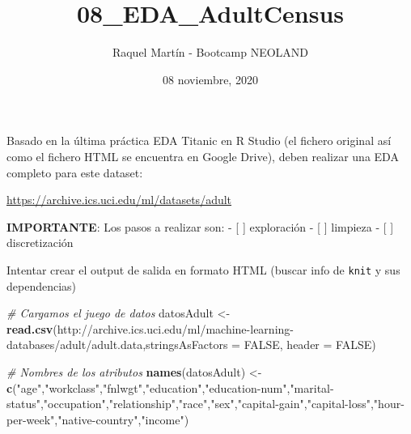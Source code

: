 \documentclass[]{article}
\title{08\_EDA\_AdultCensus}
\author{Raquel Martín - Bootcamp NEOLAND}
\date{08 noviembre, 2020}
\newenvironment{Shaded}{\begin{snugshade}}{\end{snugshade}}
\newcommand{\CommentTok}[1]{\textcolor[rgb]{0.56,0.35,0.01}{\textit{#1}}}
\newcommand{\DataTypeTok}[1]{\textcolor[rgb]{0.13,0.29,0.53}{#1}}
\newcommand{\KeywordTok}[1]{\textcolor[rgb]{0.13,0.29,0.53}{\textbf{#1}}}
\newcommand{\NormalTok}[1]{#1}
\newcommand{\OperatorTok}[1]{\textcolor[rgb]{0.81,0.36,0.00}{\textbf{#1}}}
\newcommand{\OtherTok}[1]{\textcolor[rgb]{0.56,0.35,0.01}{#1}}
\newcommand{\StringTok}[1]{\textcolor[rgb]{0.31,0.60,0.02}{#1}}
\begin{document}
\maketitle

{
\setcounter{tocdepth}{2}
\tableofcontents
}
Basado en la última práctica EDA Titanic en R Studio (el fichero
original así como el fichero HTML se encuentra en Google Drive), deben
realizar una EDA completo para este dataset:

\url{https://archive.ics.uci.edu/ml/datasets/adult}

\textbf{IMPORTANTE}: Los pasos a realizar son: - {[} {]} exploración -
{[} {]} limpieza - {[} {]} discretización

Intentar crear el output de salida en formato HTML (buscar info de
\texttt{knit} y sus dependencias)

\begin{Shaded}
\begin{Highlighting}[]
\CommentTok{\# Cargamos el juego de datos}
\NormalTok{datosAdult \textless{}{-}}\StringTok{ }\KeywordTok{read.csv}\NormalTok{(}\StringTok{\textquotesingle{}http://archive.ics.uci.edu/ml/machine{-}learning{-}databases/adult/adult.data\textquotesingle{}}\NormalTok{,}\DataTypeTok{stringsAsFactors =} \OtherTok{FALSE}\NormalTok{, }\DataTypeTok{header =} \OtherTok{FALSE}\NormalTok{)}

\CommentTok{\# Nombres de los atributos}
\KeywordTok{names}\NormalTok{(datosAdult) \textless{}{-}}\StringTok{ }\KeywordTok{c}\NormalTok{(}\StringTok{"age"}\NormalTok{,}\StringTok{"workclass"}\NormalTok{,}\StringTok{"fnlwgt"}\NormalTok{,}\StringTok{"education"}\NormalTok{,}\StringTok{"education{-}num"}\NormalTok{,}\StringTok{"marital{-}status"}\NormalTok{,}\StringTok{"occupation"}\NormalTok{,}\StringTok{"relationship"}\NormalTok{,}\StringTok{"race"}\NormalTok{,}\StringTok{"sex"}\NormalTok{,}\StringTok{"capital{-}gain"}\NormalTok{,}\StringTok{"capital{-}loss"}\NormalTok{,}\StringTok{"hour{-}per{-}week"}\NormalTok{,}\StringTok{"native{-}country"}\NormalTok{,}\StringTok{"income"}\NormalTok{)}
\end{Highlighting}
\end{Shaded}

\begin{Shaded}
\end{Shaded}
\end{document}
